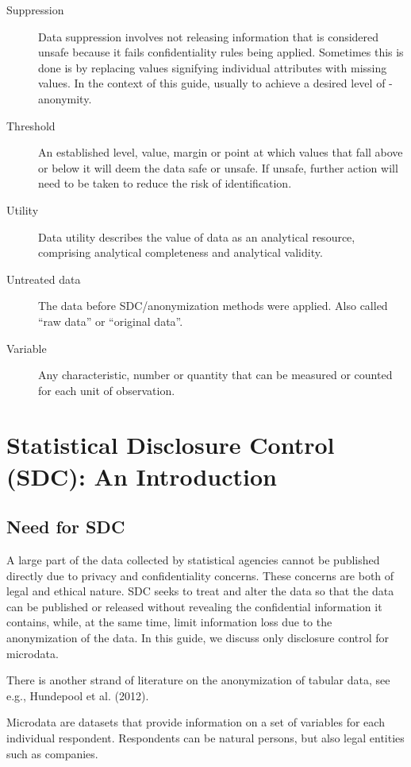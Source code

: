 \documentclass[letterpaper,10pt,english]{sphinxmanual}
\begin{document}
\begin{description}
\item[{Suppression}] \leavevmode
Data suppression involves not  releasing information that is  considered unsafe because it
fails confidentiality rules being applied. Sometimes this is done   is by replacing values
signifying individual attributes with missing values. In the context of this guide,
usually to achieve a  desired level of - anonymity.

\item[{Threshold}] \leavevmode
An established level, value,   margin or point at which values   that fall above or
below it will  deem the data safe or unsafe. If  unsafe, further action will need
to be taken to reduce the risk of identification.

\item[{Utility}] \leavevmode
Data utility describes the value  of data as an analytical  resource, comprising analytical
completeness and analytical validity.

\item[{Untreated data}] \leavevmode
The data before SDC/anonymization methods were applied. Also called “raw data” or “original data”.

\item[{Variable}] \leavevmode
Any characteristic, number or  quantity that can be measured or  counted for each unit of  observation.

\end{description}


\chapter{Statistical Disclosure Control (SDC): An Introduction}
\label{\detokenize{SDC_intro:statistical-disclosure-control-sdc-an-introduction}}\label{\detokenize{SDC_intro::doc}}

\section{Need for SDC}
\label{\detokenize{SDC_intro:need-for-sdc}}
A large part of the data collected by statistical agencies cannot be
published directly due to privacy and confidentiality concerns. These
concerns are both of legal and ethical nature. SDC seeks to treat and
alter the data so that the data can be published or released without
revealing the confidential information it contains, while, at the same
time, limit information loss due to the anonymization of the data. In
this guide, we discuss only disclosure control for
microdata. %
\begin{footnote}[1]\sphinxAtStartFootnote
There is another strand of literature on the anonymization of tabular
data, see e.g., Hundepool et al. (2012).
%
\end{footnote} Microdata are datasets that provide
information on a set of variables for each individual respondent.
Respondents can be natural persons, but also legal entities such as
companies.
\end{document}
